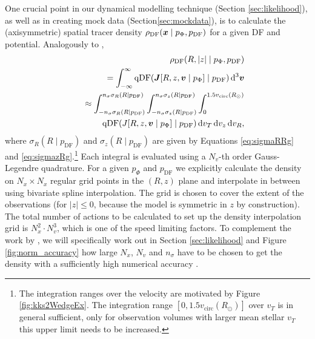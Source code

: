 One crucial point in our dynamical modelling technique (Section \ref{sec:likelihood}), as well as in creating mock data (Section\ref{sec:mockdata}), is to calculate the (axisymmetric) spatial tracer density $\rho_\text{DF}(\boldsymbol{x} \mid p_{\Phi},p_\text{DF})$ for a given DF and potential. Analogously to \citet{2013ApJ...779..115B}, 
\begin{eqnarray}
&&\rho_\text{DF}(R,|z| \mid p_{\Phi},p_\text{DF}) \nonumber\\
&&= \int_{-\infty}^{\infty} \text{qDF}(\vect{J}[R,z,\vect{v} \mid p_{\Phi}] \mid p_\text{DF}) \Diff3\vect{v}  \\%
&&\approx \int_{-n_\sigma \sigma_R(R \mid p_\text{DF})}^{n_\sigma \sigma_R(R \mid p_\text{DF})} \int_{-n_\sigma\sigma_z(R \mid p_\text{DF})}^{n_\sigma \sigma_z(R \mid p_\text{DF})} \int_{0}^{1.5 v_\text{circ}(R_\odot)}  \nonumber\\
& & \hspace{1cm} \text{qDF}(J[R,z,\vect{v} \mid p_{\Phi}] \mid p_\text{DF}) \diff v_T \diff v_z \diff v_R, \label{eq:tracerdensity}
\end{eqnarray}
where $\sigma_R(R \mid p_\text{DF})$ and $\sigma_z(R \mid p_\text{DF})$ are given by Equations \ref{eq:sigmaRRg} and \ref{eq:sigmazRg}.\footnote{The integration ranges over the velocity are motivated by Figure \ref{fig:kks2WedgeEx}. The integration range $[0,1.5 v_\text{circ}(R_\odot)]$ over $v_T$ is in general sufficient, only for observation volumes with larger mean stellar $v_T$ this upper limit needs to be increased.} Each integral is evaluated using a $N_v$-th order Gauss-Legendre quadrature. For a given $p_\Phi$ and $p_\text{DF}$ we explicitly calculate the density on $N_x \times N_x$ regular grid points in the $(R,z)$ plane and interpolate in between using bivariate spline interpolation. The grid is chosen to cover the extent of the observations (for $|z|\leq0$, because the model is symmetric in $z$ by construction). The total number of actions to be calculated to set up the density interpolation grid is $N_x^2 \cdot N_v^3$, which is one of the speed limiting factors. To complement the work by \citet{2013ApJ...779..115B}, we will specifically work out in Section \ref{sec:likelihood} and Figure \ref{fig:norm_accuracy} how large $N_x$, $N_v$ and $n_\sigma$ have to be chosen to get the density with a sufficiently high numerical accuracy . 


